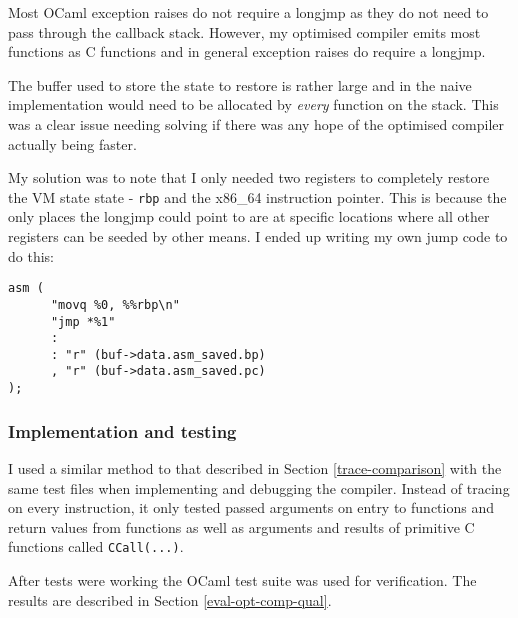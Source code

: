 Most OCaml exception raises do not require a longjmp as they do not need to pass through
the callback stack. However, my optimised compiler emits most functions as C functions and in
general exception raises do require a longjmp.

The buffer used to store the state to restore is rather large and in the naive implementation would
need to be allocated by \emph{every} function on the stack. This was a clear issue needing solving
if there was any hope of the optimised compiler actually being faster.

My solution was to note that I only needed two registers to completely restore the VM state
state - \texttt{rbp} and the x86\_64 instruction pointer. This is because the only places the
longjmp could point to are at specific locations where all other registers can be seeded by other
means. I ended up writing my own jump code to do this:

\begin{verbatim}
asm (
      "movq %0, %%rbp\n"
      "jmp *%1"
      :
      : "r" (buf->data.asm_saved.bp)
      , "r" (buf->data.asm_saved.pc)
);
\end{verbatim}

\subsubsection{Implementation and testing}

I used a similar method to that described in Section \ref{trace-comparison} with the same test
files
when implementing and debugging the compiler. Instead of tracing on every instruction, it only
tested
passed arguments on entry to functions and return values from functions as well as arguments and
results of
primitive C functions called \texttt{CCall(...)}.

After tests were working the OCaml test suite was used for verification. The results are described
in Section
\ref{eval-opt-comp-qual}.

